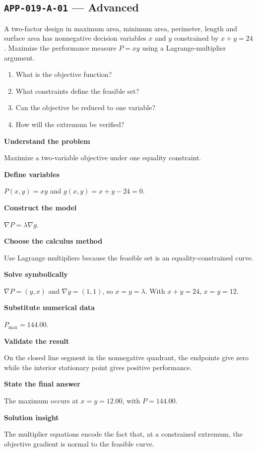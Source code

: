 \documentclass[11pt]{book}
\newcommand{\pid}[1]{\texttt{#1}}
\begin{document}
\subsection*{\pid{APP-019-A-01} — Advanced}
\begin{problembox}
A two-factor design in maximum area, minimum area, perimeter, length and surface area has nonnegative decision variables $x$ and $y$ constrained by $x+y=24$. Maximize the performance measure $P=xy$ using a Lagrange-multiplier argument.
\end{problembox}
\begin{promptbox}\begin{enumerate}
\item What is the objective function?
\item What constraints define the feasible set?
\item Can the objective be reduced to one variable?
\item How will the extremum be verified?
\end{enumerate}\end{promptbox}
\begin{solutionbox}
\textbf{Understand the problem}\par Maximize a two-variable objective under one equality constraint.\par\medskip
\textbf{Define variables}\par $P(x,y)=xy$ and $g(x,y)=x+y-24=0$.\par\medskip
\textbf{Construct the model}\par $\nabla P=\lambda\nabla g$.\par\medskip
\textbf{Choose the calculus method}\par Use Lagrange multipliers because the feasible set is an equality-constrained curve.\par\medskip
\textbf{Solve symbolically}\par $\nabla P=(y,x)$ and $\nabla g=(1,1)$, so $x=y=\lambda$. With $x+y=24$, $x=y=12$.\par\medskip
\textbf{Substitute numerical data}\par $P_{\max}=144.00$.\par\medskip
\textbf{Validate the result}\par On the closed line segment in the nonnegative quadrant, the endpoints give zero while the interior stationary point gives positive performance.\par\medskip
\textbf{State the final answer}\par The maximum occurs at $x=y=12.00$, with $P=144.00$.\par\medskip
\textbf{Solution insight}\par The multiplier equations encode the fact that, at a constrained extremum, the objective gradient is normal to the feasible curve.\par\medskip
\end{solutionbox}
\end{document}
